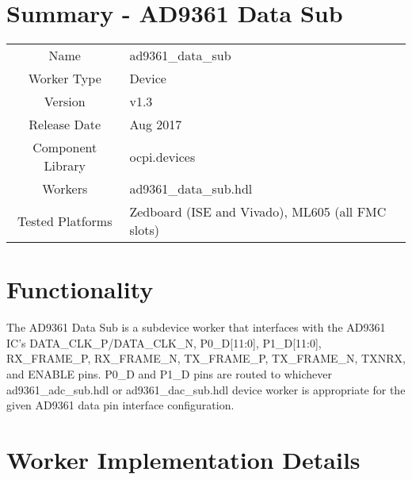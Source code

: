 \documentclass{article}
\author{} %
\date{Version \docVersion} %
\title{\docTitle}
\def\docVersion{1.3}
\def\comp{ad9361\_data\_sub}
\def\Comp{AD9361 Data Sub}
\begin{document}
\section*{Summary - \Comp}
\begin{tabular}{|c|M{13.5cm}|}
	\hline
	                  &                  \\
	\hline
	Name              & \comp            \\
	\hline
	Worker Type       & Device           \\
	\hline
	Version           & v\docVersion     \\
	\hline
	Release Date      & Aug 2017         \\
	\hline
	Component Library & ocpi.devices     \\
	\hline
	Workers           & \comp.hdl        \\
	\hline
	Tested Platforms  &  Zedboard (ISE and Vivado), ML605 (all FMC slots) \\
	\hline
\end{tabular}

\section*{Functionality}
	The \Comp{} is a subdevice worker that interfaces with the AD9361 IC\cite{ad9361}'s DATA\_CLK\_P/DATA\_CLK\_N, P0\_D[11:0], P1\_D[11:0], RX\_FRAME\_P, RX\_FRAME\_N, TX\_FRAME\_P, TX\_FRAME\_N, TXNRX, and ENABLE pins. P0\_D and P1\_D pins are routed to whichever ad9361\_adc\_sub.hdl or ad9361\_dac\_sub.hdl device worker is appropriate for the given AD9361 data pin interface configuration.

\section*{Worker Implementation Details}
\end{document}
